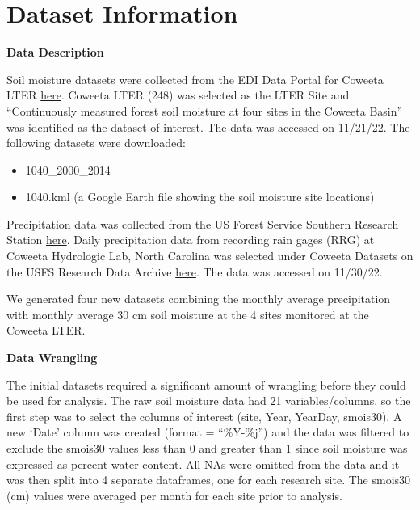 \documentclass[
  12pt,
]{article}
\providecommand{\tightlist}{%
  \setlength{\itemsep}{0pt}\setlength{\parskip}{0pt}}
\begin{document}
\newpage

\hypertarget{dataset-information}{%
\section{Dataset Information}\label{dataset-information}}

\textbf{Data Description}

Soil moisture datasets were collected from the EDI Data Portal for
Coweeta LTER \href{https://portal.edirepository.org/nis/home.jsp}{here}.
Coweeta LTER (248) was selected as the LTER Site and ``Continuously
measured forest soil moisture at four sites in the Coweeta Basin'' was
identified as the dataset of interest. The data was accessed on
11/21/22. The following datasets were downloaded:

\begin{itemize}
\tightlist
\item
  1040\_2000\_2014
\item
  1040.kml (a Google Earth file showing the soil moisture site
  locations)
\end{itemize}

Precipitation data was collected from the US Forest Service Southern
Research Station
\href{https://www.srs.fs.usda.gov/coweeta/tools-and-data/}{here}. Daily
precipitation data from recording rain gages (RRG) at Coweeta Hydrologic
Lab, North Carolina was selected under Coweeta Datasets on the USFS
Research Data Archive
\href{https://www.fs.usda.gov/rds/archive/Catalog/RDS-2017-0031}{here}.
The data was accessed on 11/30/22.

We generated four new datasets combining the monthly average
precipitation with monthly average 30 cm soil moisture at the 4 sites
monitored at the Coweeta LTER.

\textbf{Data Wrangling}

The initial datasets required a significant amount of wrangling before
they could be used for analysis. The raw soil moisture data had 21
variables/columns, so the first step was to select the columns of
interest (site, Year, YearDay, smois30). A new `Date' column was created
(format = ``\%Y-\%j'') and the data was filtered to exclude the smois30
values less than 0 and greater than 1 since soil moisture was expressed
as percent water content. All NAs were omitted from the data and it was
then split into 4 separate dataframes, one for each research site. The
smois30 (cm) values were averaged per month for each site prior to
analysis.
\end{document}
